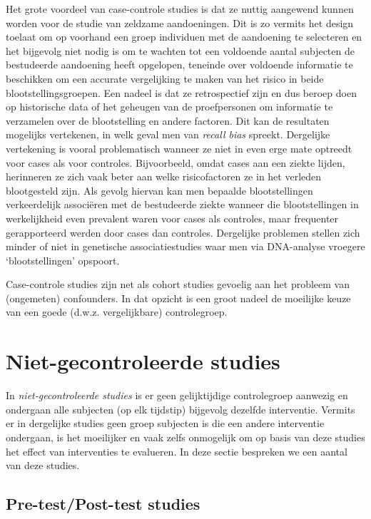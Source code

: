 \documentclass[
  12pt,dutch]{book}
\theoremstyle{definition}
\theoremstyle{definition}
\theoremstyle{definition}
\theoremstyle{definition}
\theoremstyle{remark}
\begin{document}
Het grote voordeel van case-controle studies is dat ze nuttig aangewend
kunnen worden voor de studie van zeldzame aandoeningen. Dit is zo vermits
het design toelaat om op voorhand een groep individuen met de aandoening te
selecteren en het bijgevolg niet nodig is om te wachten tot een voldoende
aantal subjecten de bestudeerde aandoening heeft opgelopen, teneinde over voldoende informatie te beschikken om een accurate vergelijking te maken van het risico in beide blootstellingsgroepen. Een nadeel is
dat ze retrospectief zijn en dus beroep doen op historische data of het
geheugen van de proefpersonen om informatie te verzamelen over de
blootstelling en andere factoren. Dit kan de resultaten mogelijks
vertekenen, in welk geval men van \emph{recall bias} spreekt. Dergelijke
vertekening is vooral problematisch wanneer ze niet in even erge mate
optreedt voor cases als voor controles. Bijvoorbeeld, omdat cases aan een
ziekte lijden, herinneren ze zich vaak beter aan welke risicofactoren ze in
het verleden blootgesteld zijn. Als gevolg hiervan kan men bepaalde
blootstellingen verkeerdelijk associëren met de bestudeerde ziekte wanneer
die blootstellingen in werkelijkheid even prevalent waren voor cases als
controles, maar frequenter gerapporteerd werden door cases dan controles. Dergelijke problemen stellen zich minder of niet in genetische associatiestudies waar men via DNA-analyse vroegere `blootstellingen' opspoort.

Case-controle studies zijn net als cohort studies gevoelig aan het probleem
van (ongemeten) confounders. In dat opzicht is een groot nadeel de moeilijke
keuze van een goede (d.w.z. vergelijkbare) controlegroep.

\section{Niet-gecontroleerde studies}\label{niet-gecontroleerde-studies}

In \emph{niet-gecontroleerde studies} is er geen gelijktijdige controlegroep aanwezig en
ondergaan alle subjecten (op elk tijdstip) bijgevolg dezelfde interventie. Vermits er in
dergelijke studies geen groep subjecten is die een andere interventie
ondergaan, is het moeilijker en vaak zelfs onmogelijk om op basis van deze
studies het effect van interventies te evalueren. In deze sectie bespreken we een aantal van deze studies.

\subsection{Pre-test/Post-test studies}\label{subsec:prepost}
\end{document}
